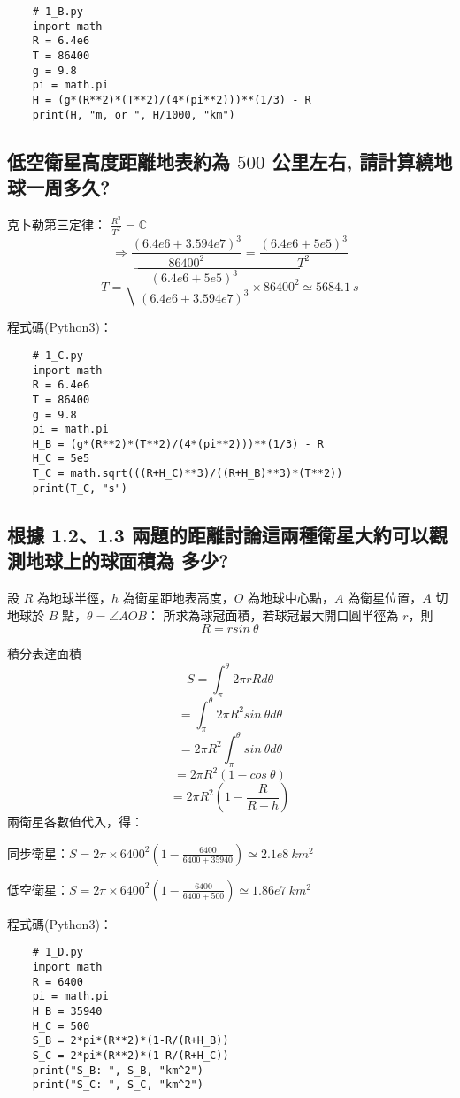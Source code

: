 \documentclass[UTF8,a4paper,12pt]{article}
\begin{document}
\begin{lstlisting}
    # 1_B.py
    import math
    R = 6.4e6
    T = 86400
    g = 9.8
    pi = math.pi
    H = (g*(R**2)*(T**2)/(4*(pi**2)))**(1/3) - R
    print(H, "m, or ", H/1000, "km")
\end{lstlisting}

\subsection{低空衛星高度距離地表約為 \texorpdfstring{$500$}{500} 公里左右, 請計算繞地球一周多久?}

克卜勒第三定律： $\frac{R^3}{T^2} = \mathbb{C} $
$$ \Rightarrow \frac{ {(6.4e6 + 3.594e7)}^3 }{86400^2} = \frac{ {(6.4e6+5e5)}^3 }{T^2} $$
$$ T = \sqrt{\frac{{(6.4e6+5e5)}^3}{{(6.4e6+3.594e7)}^3} \times 86400^2 } \simeq 5684.1\ s $$

程式碼(Python3)：

\begin{lstlisting}
    # 1_C.py
    import math
    R = 6.4e6
    T = 86400
    g = 9.8
    pi = math.pi
    H_B = (g*(R**2)*(T**2)/(4*(pi**2)))**(1/3) - R
    H_C = 5e5
    T_C = math.sqrt(((R+H_C)**3)/((R+H_B)**3)*(T**2))
    print(T_C, "s")
\end{lstlisting}

\subsection{根據 1.2、1.3 兩題的距離討論這兩種衛星大約可以觀測地球上的球面積為
多少?}

設 $R$ 為地球半徑，$h$ 為衛星距地表高度，$O$ 為地球中心點，$A$ 為衛星位置，$A$ 切地球於 $B$ 點，$\theta = \angle AOB $：
所求為球冠面積，若球冠最大開口圓半徑為 $r$，則 $$R = r sin\ \theta$$

積分表達面積
$$ S = \int^{\theta}_\pi 2\pi r R d\theta $$
$$ = \int^{\theta}_\pi 2\pi R^2 sin\ \theta d\theta $$
$$ = 2\pi R^2 \int^\theta_\pi sin\ \theta d \theta $$
$$ = 2\pi R^2 (1-cos\ \theta ) $$
$$ = 2\pi R^2 (1 - \frac{R}{R+h}) $$
兩衛星各數值代入，得：

同步衛星：$ S = 2\pi \times 6400^2 (1 - \frac{6400}{6400+35940}) \simeq 2.1e8\ km^2 $

低空衛星：$ S = 2\pi \times 6400^2 (1 - \frac{6400}{6400+500}) \simeq 1.86e7\ km^2 $

程式碼(Python3)：

\begin{lstlisting}
    # 1_D.py
    import math
    R = 6400
    pi = math.pi
    H_B = 35940
    H_C = 500
    S_B = 2*pi*(R**2)*(1-R/(R+H_B))
    S_C = 2*pi*(R**2)*(1-R/(R+H_C))
    print("S_B: ", S_B, "km^2")
    print("S_C: ", S_C, "km^2")
\end{lstlisting}
\end{document}
